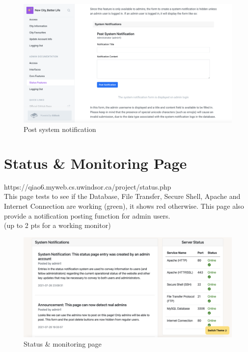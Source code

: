 \documentclass[12pt, letterpaper]{article}
\begin{document}
 \begin{figure}[htbp]
	\centering
	\includegraphics[width=5in]{images/q18-2.png}
	\caption{Post system notification}
 \end{figure}

 \newpage

\section{Status \& Monitoring Page}
https://qiao6.myweb.cs.uwindsor.ca/project/status.php
\\This page tests to see if the Database, File Transfer, Secure Shell, Apache and Internet Connection are working (green), it shows red otherwise. This page also provide a notification posting function for admin users.
\\(up to 2 pts for a working monitor)

\begin{figure}[htbp]
	\centering
	\includegraphics[width=5in]{images/q19.png}
	\caption{Status \& monitoring page}
 \end{figure}
\end{document}
